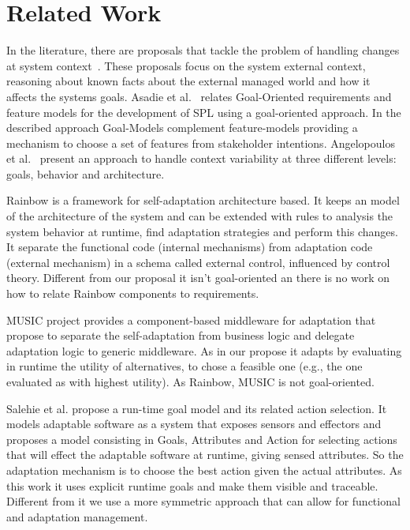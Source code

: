 \section{Related Work}
\label{sec:related}

In the literature, there are proposals that tackle the problem of handling changes at system context~\cite{angelopoulos_capturing_2015}\cite{knauss_acon:_2016}. These proposals focus on the system external context, reasoning about known facts about the external managed world and how it affects the systems goals.
Asadie et al.~\cite{asadi_goal-oriented_2011} relates Goal-Oriented requirements and feature models for the development of SPL using a goal-oriented approach. In the described approach Goal-Models complement feature-models providing a mechanism to choose a set of features from stakeholder intentions.
Angelopoulos et al.~\cite{angelopoulos_capturing_2015} present an approach to handle context variability at three different levels: goals, behavior and architecture.


Rainbow is a framework for self-adaptation architecture based\cite{garlan_rainbow:_2004}. It keeps an model of the architecture of the system and can be extended with rules to analysis the system behavior at runtime, find adaptation strategies and perform this changes. It separate the functional code (internal mechanisms) from adaptation code (external mechanism) in a schema called external control, influenced by control theory. \cite{garlan_software_2009}
Different from our proposal it isn't goal-oriented an there is no work on how to relate Rainbow components to requirements.

MUSIC project provides a component-based middleware for adaptation that propose to separate the self-adaptation from business logic and delegate adaptation logic to generic middleware. As in our propose it adapts by evaluating in runtime the utility of alternatives, to chose a feasible one (e.g., the one evaluated as with highest utility)\cite{rouvoy_music:_2009}. As Rainbow, MUSIC is not goal-oriented.

Salehie et al. \cite{salehie_towards_2012} propose a run-time goal model and its related action selection. It models adaptable software as a system that exposes sensors and effectors and  proposes a model consisting in Goals, Attributes and Action for selecting actions that will effect the adaptable software at runtime, giving sensed attributes.
So the adaptation mechanism is to choose the best action given the actual attributes.
As this work it uses explicit runtime goals and make them visible and traceable.
Different from it we use a more symmetric approach that can allow for functional
and adaptation management.

